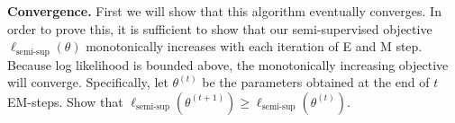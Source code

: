\item{}
\textbf{Convergence.}
First we will show that this algorithm eventually converges. In order to prove this, it is sufficient to show that our semi-supervised objective $\ell_\text{semi-sup}(\theta)$ monotonically increases with each iteration of E and M step. Because log likelihood is bounded above, the monotonically increasing objective will converge. Specifically, let $\theta^{(t)}$ be the parameters obtained at the end of $t$ EM-steps. Show that $\ell_\text{semi-sup}(\theta^{(t+1)}) \ge \ell_\text{semi-sup}(\theta^{(t)})$. 


